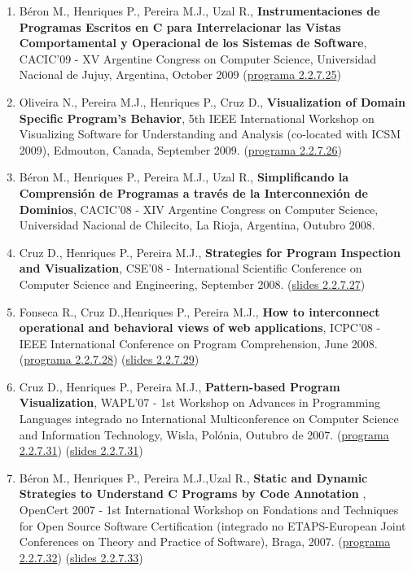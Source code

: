 \documentclass[11pt]{article}
\begin{document}
\begin{enumerate}
\item {Béron M., Henriques P., Pereira M.J., Uzal R., {\bf{ Instrumentaciones de Programas Escritos en C para Interrelacionar las Vistas Comportamental y Operacional de los Sistemas de Software}}, CACIC'09 - XV Argentine Congress on Computer Science, Universidad Nacional de Jujuy, Argentina, October 2009 (\href{run:ComunicacoesOrais/programas/CACIC2009.pdf}{programa 2.2.7.25})}

\item {Oliveira N., Pereira M.J., Henriques P., Cruz D., {\bf{ Visualization of Domain Specific Program's Behavior}}, 5th IEEE International Workshop on Visualizing Software for Understanding and Analysis (co-located with ICSM 2009), Edmouton, Canada, September 2009. (\href{run:ComunicacoesOrais/programas/VISSOFT2009.pdf}{programa 2.2.7.26})}

\item {Béron M., Henriques P., Pereira M.J., Uzal R., {\bf{ Simplificando la Comprensión de Programas a través de la Interconnexión de Dominios}}, CACIC'08 - XIV Argentine Congress on Computer Science, Universidad Nacional de Chilecito, La Rioja, Argentina, Outubro 2008.}

\item {Cruz D., Henriques P., Pereira M.J., {\bf{ Strategies for Program Inspection and Visualization}}, CSE'08 - International Scientific Conference on Computer Science and Engineering, September 2008. (\href{run:ComunicacoesOrais/CSE08apres.pdf}{slides 2.2.7.27})}

\item {Fonseca R., Cruz D.,Henriques P., Pereira M.J., {\bf{ How to interconnect operational and behavioral views of web applications}}, ICPC'08 - IEEE International Conference on Program Comprehension, June 2008. (\href{run:ComunicacoesOrais/programas/ICPC2008.pdf}{programa 2.2.7.28}) (\href{run:ComunicacoesOrais/ICPC08apres.pdf}{slides 2.2.7.29})}

\item {Cruz D., Henriques P., Pereira M.J., {\bf{ Pattern-based Program Visualization}}, WAPL'07 - 1st Workshop on Advances in Programming Languages integrado no International Multiconference on Computer Science and Information Technology, Wisla, Polónia, Outubro de 2007. (\href{run:ComunicacoesOrais/programas/WAPL2007.pdf}{programa 2.2.7.31}) (\href{run:ComunicacoesOrais/WAPL2007apres.pdf}{slides 2.2.7.31})}

\item {Béron M., Henriques P., Pereira M.J.,Uzal R., {\bf{ Static and Dynamic Strategies to Understand C Programs by Code Annotation}} , OpenCert 2007 - 1st International Workshop on Fondations and Techniques for Open Source Software Certification (integrado no ETAPS-European Joint Conferences on Theory and Practice of Software), Braga, 2007. (\href{run:ComunicacoesOrais/programas/OpenCert2007.pdf}{programa 2.2.7.32}) (\href{run:ComunicacoesOrais/OPENCERT07apres.pdf}{slides 2.2.7.33})}


\end{enumerate}
\end{document}
